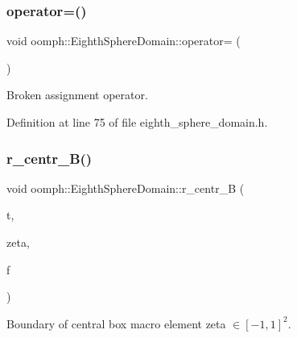 \mbox{\label{classoomph_1_1EighthSphereDomain_a3533eb2f34986e995a779d2841267b12}} 
\subsubsection{\texorpdfstring{operator=()}{operator=()}}
{\footnotesize\ttfamily void oomph\+::\+Eighth\+Sphere\+Domain\+::operator= (\begin{DoxyParamCaption}\item[{const \hyperlink{classoomph_1_1EighthSphereDomain}{Eighth\+Sphere\+Domain} \&}]{ }\end{DoxyParamCaption})\hspace{0.3cm}{\ttfamily [inline]}}



Broken assignment operator. 



Definition at line 75 of file eighth\+\_\+sphere\+\_\+domain.\+h.

\mbox{\label{classoomph_1_1EighthSphereDomain_a3ba94d9786fc6c544d82a392f8bf3dd6}} 
\subsubsection{\texorpdfstring{r\+\_\+centr\+\_\+\+B()}{r\_centr\_B()}}
{\footnotesize\ttfamily void oomph\+::\+Eighth\+Sphere\+Domain\+::r\+\_\+centr\+\_\+B (\begin{DoxyParamCaption}\item[{const unsigned \&}]{t,  }\item[{const Vector$<$ double $>$ \&}]{zeta,  }\item[{Vector$<$ double $>$ \&}]{f }\end{DoxyParamCaption})\hspace{0.3cm}{\ttfamily [private]}}



Boundary of central box macro element zeta $ \in [-1,1]^2 $. 

